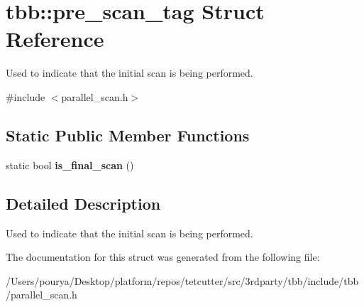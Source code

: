\hypertarget{structtbb_1_1pre__scan__tag}{}\section{tbb\+:\+:pre\+\_\+scan\+\_\+tag Struct Reference}
\label{structtbb_1_1pre__scan__tag}


Used to indicate that the initial scan is being performed.  




{\ttfamily \#include $<$parallel\+\_\+scan.\+h$>$}

\subsection*{Static Public Member Functions}
\begin{DoxyCompactItemize}
\item 
\hypertarget{structtbb_1_1pre__scan__tag_a1d71947e8273d28e01620f92a292be59}{}static bool {\bfseries is\+\_\+final\+\_\+scan} ()\label{structtbb_1_1pre__scan__tag_a1d71947e8273d28e01620f92a292be59}

\end{DoxyCompactItemize}


\subsection{Detailed Description}
Used to indicate that the initial scan is being performed. 



The documentation for this struct was generated from the following file\+:\begin{DoxyCompactItemize}
\item 
/\+Users/pourya/\+Desktop/platform/repos/tetcutter/src/3rdparty/tbb/include/tbb/parallel\+\_\+scan.\+h\end{DoxyCompactItemize}
